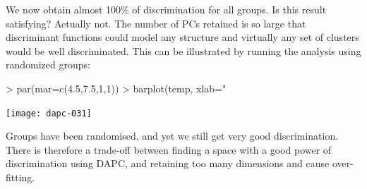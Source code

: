 \documentclass{article}
\begin{document}
\noindent We now obtain almost 100\% of discrimination for all groups.
Is this result satisfying? Actually not.
The number of PCs retained is so large that discriminant functions could model any structure and
virtually any set of clusters would be well discriminated.
This can be illustrated by running the analysis using randomized groups:
\begin{Schunk}
\end{Schunk}
\begin{Schunk}
\begin{Sinput}
> par(mar=c(4.5,7.5,1,1))
> barplot(temp, xlab="%
\end{Sinput}
\end{Schunk}
\texttt{[image: dapc-031]}

\noindent
Groups have been randomised, and yet we still get very good discrimination.
There is therefore a trade-off between finding a space with a good power of discrimination using
DAPC, and retaining too many dimensions and cause over-fitting.




\end{document}
